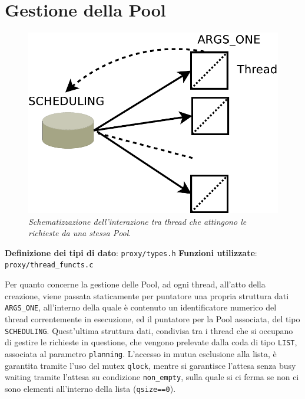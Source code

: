 \section{Gestione della Pool}\label{sec:gdp}
\begin{figure}[!th]
\begin{centering}
\includegraphics[scale=0.5]{fig/fig01.pdf}
\caption{\textit{Schematizzazione dell'interazione tra thread che attingono le
richieste da una stessa Pool}.}
\end{centering}
\label{fig:gdppw}
\end{figure}
\begin{itemize}
\diam \textbf{Definizione dei tipi di dato}: \texttt{proxy/types.h} 
\diam \textbf{Funzioni utilizzate}: \texttt{proxy/thread\_functs.c}
\end{itemize}
Per quanto concerne la gestione delle Pool, ad ogni thread, all'atto della
creazione, viene passata staticamente per puntatore una propria struttura dati
\texttt{ARGS\_ONE}, all'interno della quale è contenuto un identificatore numerico
del thread correntemente in esecuzione, ed il puntatore per la Pool associata,
del tipo \texttt{SCHEDULING}. Quest'ultima struttura dati, condivisa tra i thread
che si occupano di gestire le richieste in questione, che vengono prelevate dalla
coda di tipo \texttt{LIST}, associata al parametro \texttt{planning}. L'accesso in 
mutua esclusione alla lista, è garantita tramite l'uso del mutex \texttt{qlock},
mentre si garantisce l'attesa senza busy waiting tramite l'attesa su condizione
\texttt{non\_empty}, sulla quale si ci ferma se non ci sono elementi all'interno
della lista (\texttt{qsize==0}).

